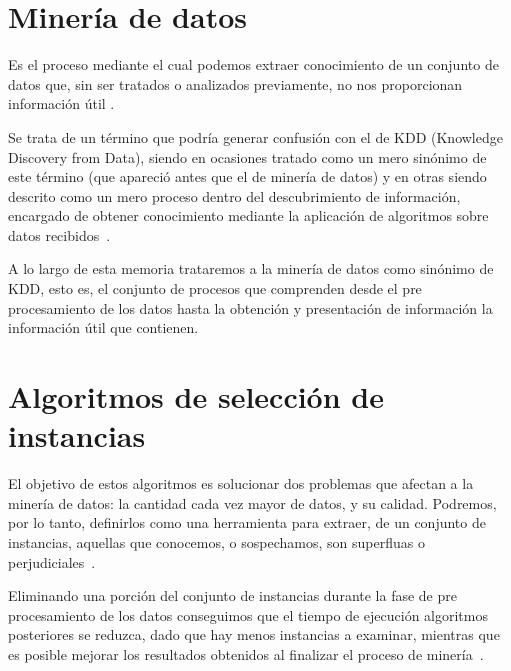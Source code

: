 \label{chapConceptos}


\section{Minería de datos}\label{DefMineria}

Es el proceso mediante el cual podemos extraer conocimiento de un conjunto de datos que, sin ser tratados o analizados previamente, no nos proporcionan información útil \cite{DataMiningConcepts}.

Se trata de un término que podría generar confusión con el de KDD (Knowledge Discovery from Data), siendo en ocasiones tratado como un mero sinónimo de este término (que apareció antes que el de minería de datos) y en otras siendo descrito como un mero proceso dentro del descubrimiento de información, encargado de obtener conocimiento mediante la aplicación de algoritmos sobre datos recibidos~\cite{DataMiningConcepts}. 

A lo largo de esta memoria trataremos a la minería de datos como sinónimo de KDD, esto es, el conjunto de procesos que comprenden desde el pre procesamiento de los datos hasta la obtención y presentación de información la información útil que contienen.


\section{Algoritmos de selección de instancias}\label{sec:DefAlgSel}

El objetivo de estos algoritmos es solucionar dos problemas que afectan a la minería de datos: la cantidad cada vez mayor de datos, y su calidad. Podremos, por lo tanto,  definirlos como una herramienta para extraer, de un conjunto de instancias, aquellas que conocemos, o sospechamos, son superfluas o perjudiciales~\cite{IntroInstanceSelect}.

Eliminando una porción del conjunto de instancias durante la fase de pre procesamiento de los datos conseguimos que el tiempo de ejecución algoritmos posteriores se reduzca, dado que hay menos instancias a examinar, mientras que es posible mejorar los resultados obtenidos al finalizar el proceso de minería~\cite{IntroInstanceSelect}.

